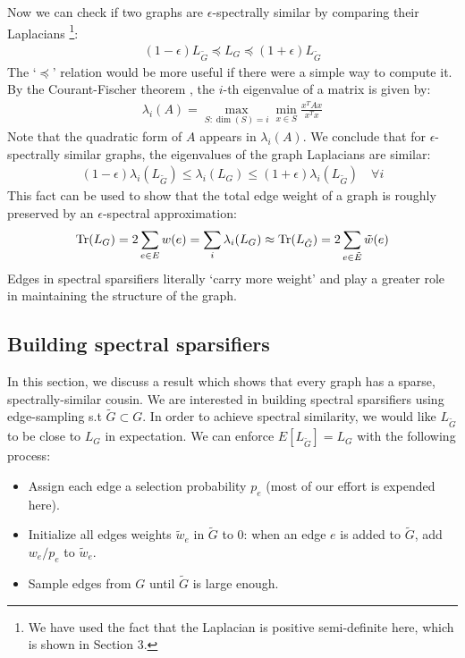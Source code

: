\documentclass{article}
\begin{document}
Now we can check if two graphs are $\epsilon$-spectrally similar by
comparing their Laplacians \footnote{We have used the fact that the
Laplacian is positive semi-definite here, which is shown in Section 3.}:
\begin{align*}
    (1 - \epsilon)L_{\tilde{G}} \preceq L_G \preceq (1 +
    \epsilon)L_{\tilde{G}}
\end{align*}
The `$\preceq$' relation would be more useful if there were a simple way to
compute it. By the Courant-Fischer theorem \cite{CourantFischer}, the $i$-th
eigenvalue of a matrix is given by:
\begin{align*}
    \lambda_i(A) = \max_{S: \dim(S) = i} \min_{x \in S} \frac{x^TAx}{x^Tx}
\end{align*}
Note that the quadratic form of $A$ appears in $\lambda_i(A)$. We conclude
that for $\epsilon$-spectrally similar graphs, the eigenvalues of the graph
Laplacians are similar:
\begin{align*}
    (1 - \epsilon)\lambda_i(L_{\tilde{G}}) \leq \lambda_i(L_G) \leq (1 +
    \epsilon)\lambda_i(L_{\tilde{G}}) \quad \forall{i}
\end{align*}
This fact can be used to show that the total edge weight of a graph is
roughly preserved by an $\epsilon$-spectral approximation:
\begin{align*}
    \text{Tr}(L_G) = 2\sum_{e \in E} w(e) = \sum_i \lambda_i(L_G) \approx
    \text{Tr}(L_{\tilde{G}}) = 2\sum_{e \in \tilde{E}} \tilde{w}(e)
\end{align*}
Edges in spectral sparsifiers literally `carry more weight' and play a
greater role in maintaining the structure of the graph.

\subsection{Building spectral sparsifiers}

In this section, we discuss a result which shows that every graph has a
sparse, spectrally-similar cousin. We are interested in building spectral
sparsifiers using edge-sampling s.t $\tilde{G} \subset G$. In order to
achieve spectral similarity, we would like $L_{\tilde{G}}$ to be close to
$L_G$ in expectation. We can enforce $E[L_{\tilde{G}}] = L_G$ with the
following process:
\begin{itemize}
    \item Assign each edge a selection probability $p_e$ (most of our effort
        is expended here).
    \item Initialize all edges weights $\tilde{w}_e$ in $\tilde{G}$ to 0:
        when an edge $e$ is added to $\tilde{G}$, add $w_e/p_e$ to
        $\tilde{w}_e$.
    \item Sample edges from $G$ until $\tilde{G}$ is large enough.
\end{itemize}
\end{document}
